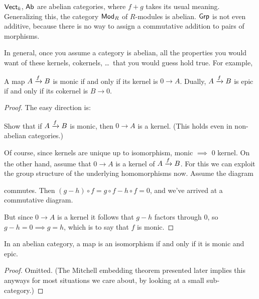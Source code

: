 \begin{example}
	\listhack
	\begin{enumerate}[(a)]
		\ii $\mathsf{Vect}_k$, $\mathsf{Ab}$ are abelian categories,
		where $f+g$ takes its usual meaning.
		\ii Generalizing this, the category $\mathsf{Mod}_R$ of $R$-modules is abelian.
		\ii $\mathsf{Grp}$ is not even additive, because there is no way to assign
		a commutative addition to pairs of morphisms.
	\end{enumerate}
\end{example}

In general, once you assume a category is abelian, all the properties you would want
of these kernels, cokernels, \dots\ that you would guess hold true.
For example,
\begin{proposition}
	A map $A \xrightarrow{f} B$ is monic if and only if its kernel is $0 \to A$.
	Dually, $A \xrightarrow{f} B$ is epic if and only if its cokernel is $B \to 0$.
\end{proposition}
\begin{proof}
	The easy direction is:
	\begin{exercise}
		Show that if $A \xrightarrow{f} B$ is monic, then $0 \to A$ is a kernel.
		(This holds even in non-abelian categories.)
	\end{exercise}
	Of course, since kernels are unique up to isomorphism, monic $\implies$ $0$ kernel.
	On the other hand, assume that $0 \to A$ is a kernel of $A \xrightarrow{f} B$.
	For this we can exploit the group structure of the underlying homomorphisms now.
	Assume the diagram
	\begin{center}
	\end{center}
	commutes.
	Then $(g - h) \circ f = g \circ f - h \circ f = 0$, and we've arrived at a commutative diagram.
	\begin{center}
	\end{center}
	But since $0 \to A$ is a kernel it follows that $g-h$ factors through $0$,
	so $g-h = 0 \implies g = h$, which is to say that $f$ is monic.
\end{proof}
\begin{proposition}
	In an abelian category,
	a map is an isomorphism if and only if it is monic and epic.
\end{proposition}
\begin{proof}
	Omitted. (The Mitchell embedding theorem
	presented later implies this anyways for
	most situations we care about,
	by looking at a small sub-category.)
\end{proof}

